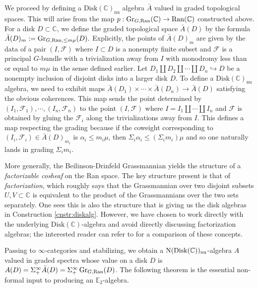\begin{cnstr}\label{cnstr:diskalg}
We proceed by defining a $\mathrm{Disk}(\mathbb{C})_{\mathrm{nu}}$ algebra $\bar{A}$ valued in graded topological spaces.  This will arise from the map $p:\operatorname{\mathrm{Gr}}_{G,\operatorname{\mathrm{Ran}}}(\mathbb{C}) \to \operatorname{\mathrm{Ran}}(\mathbb{C})$ constructed above.  For a disk $D\subset \mathbb{C}$, we define the graded topological space $\bar{A}(D)$ by the formula $\bar{A}(D)_m := \operatorname{\mathrm{Gr}}_{G,\operatorname{\mathrm{Ran}}, \leq m\mu}(D).$  Explicitly, the points of $\bar{A}(D)_m$ are given by the data of a pair $(I, \mathcal{F})$ where $I\subset D$ is a nonempty finite subset and $\mathcal{F}$ is a principal $G$-bundle with a trivialization away from $I$ with monodromy less than or equal to $m\mu$ in the sense defined earlier.  Let $D_1 \coprod D_2\coprod \cdots \coprod D_n \hookrightarrow D$ be a nonempty inclusion of disjoint disks into a larger disk $D$.  To define a $\mathrm{Disk}(\mathbb{C})_{\mathrm{nu}}$ algebra, we need to exhibit maps $\bar{A}(D_1)\times \cdots \times \bar{A}(D_n) \to \bar{A}(D)$ satisfying the obvious coherences.  %
This map sends the point determined by $(I_1, \mathcal{F}_1), \cdots, (I_n, \mathcal{F}_n)$ to the point $(I, \mathcal{F})$ where $I= I_1 \coprod \cdots \coprod I_n$ and $\mathcal{F}$ is obtained by gluing the $\mathcal{F}_i$ along the trivializations away from $I$.  This defines a map respecting the grading because if the coweight corresponding to $(I_i,\mathcal{F}_i) \in \bar{A}(D)_{m_i}$ is $\alpha_i\leq m_i \mu$, then $\Sigma_i \alpha_i \leq (\Sigma_i m_i) \mu$ and so one naturally lands in grading $\Sigma_i m_i$.  
\end{cnstr}
\begin{rmk}
More generally, the Beilinson-Drinfeld Grassmannian yields the structure of a \emph{factorizable cosheaf} on the Ran space.  The key structure present is that of \emph{factorization}, which roughly says that the Grassmannian over two disjoint subsets $U,V\subset \mathbb{C}$ is equivalent to the product of the Grassmannians over the two sets separately.  One sees this is also the structure that is giving us the disk algebras in Construction \ref{cnstr:diskalg}.  However, we have chosen to work directly with the underlying $\mathrm{Disk}(\mathbb{C})$-algebra and avoid directly discussing factorization algebras; the interested reader can refer to \cite[\S 5.5.4.10]{HA} for a comparison of these concepts.  
\end{rmk}

Passing to $\infty$-categories and stabilizing, we obtain a $\operatorname{\mathrm{N}}(\mathrm{Disk}(\mathbb{C}))_{\mathrm{nu}}$-algebra $A$ valued in graded spectra whose value on a disk $D$ is $A(D) = \Sigma^{\infty}_+ \bar{A}(D) = \Sigma^{\infty}_+ \operatorname{\mathrm{Gr}}_{G,\operatorname{\mathrm{Ran}}}(D)$.  The following theorem is the essential non-formal input to producing an $\mathbb{E}_2$-algebra.  

